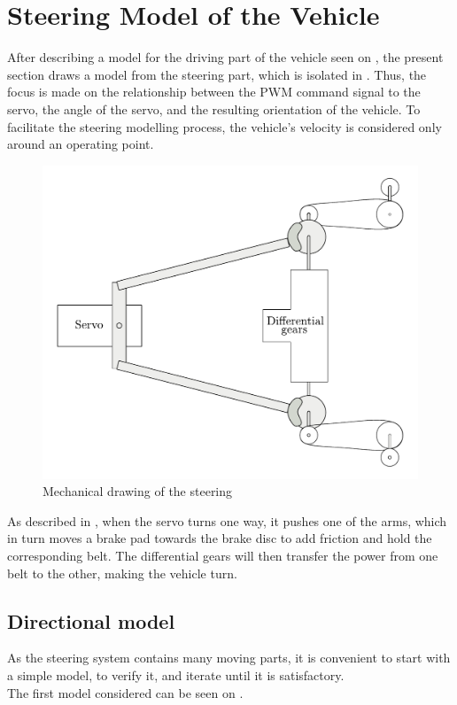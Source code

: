 \section{Steering Model of the Vehicle}\label{sec:SteeringModel}
After describing a model for the driving part of the vehicle seen on , the present section draws a model from the steering part, which is isolated in . Thus, the focus is made on the relationship between the PWM command signal to the servo, the angle of the servo, and the resulting orientation of the vehicle. To facilitate the steering modelling process, the vehicle's velocity is considered only around an operating point.

 \begin{figure}[H]
 	\centering
 	\includegraphics[scale=0.6]{figures/steeringMechanical.pdf}
 	\caption{Mechanical drawing of the steering}
 	\label{steeringMechanical}
 \end{figure}

As described in , when the servo turns one way, it pushes one of the arms, which in turn moves  a brake pad towards the brake disc to add friction and hold the corresponding belt. The differential gears will then transfer the power from one belt to the other, making the vehicle turn.

\subsection{Directional model}
As the steering system contains many moving parts, it is convenient to start with a simple model, to verify it, and iterate until it is satisfactory.\\
%
The first model considered can be seen on .

